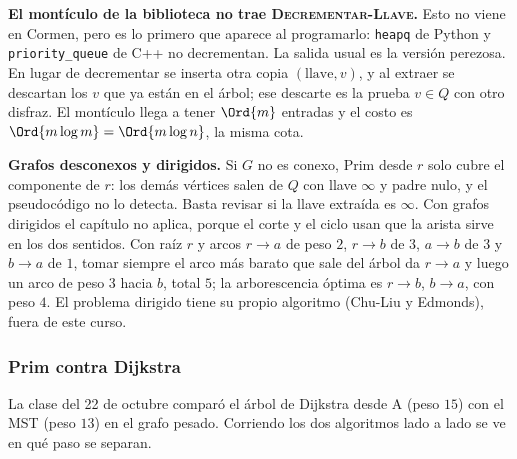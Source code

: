 \documentclass[11pt,letterpaper]{article}
\begin{document}
\begin{ojo}
  \textbf{El montículo de la biblioteca no trae
  \textsc{Decrementar-Llave}.} Esto no viene en Cormen, pero es lo
  primero que aparece al programarlo: \texttt{heapq} de Python y
  \texttt{priority\_queue} de C++ no decrementan. La salida usual es la
  versión perezosa. En lugar de decrementar se inserta otra copia
  $(\text{llave}, v)$, y al extraer se descartan los $v$ que ya están
  en el árbol; ese descarte es la prueba $v \in Q$ con otro disfraz. El
  montículo llega a tener $\Ord{m}$ entradas y el costo es
  $\Ord{m \log m} = \Ord{m \log n}$, la misma cota.
\end{ojo}

\begin{ojo}
  \textbf{Grafos desconexos y dirigidos.} Si $G$ no es conexo, Prim
  desde $r$ solo cubre el componente de $r$: los demás vértices salen
  de $Q$ con llave $\infty$ y padre nulo, y el pseudocódigo no lo
  detecta. Basta revisar si la llave extraída es $\infty$. Con grafos
  dirigidos el capítulo no aplica, porque el corte y el ciclo usan que
  la arista sirve en los dos sentidos. Con raíz $r$ y arcos $r \to a$
  de peso $2$, $r \to b$ de $3$, $a \to b$ de $3$ y $b \to a$ de $1$,
  tomar siempre el arco más barato que sale del árbol da $r \to a$ y
  luego un arco de peso $3$ hacia $b$, total $5$; la arborescencia
  óptima es $r \to b$, $b \to a$, con peso $4$. El problema dirigido
  tiene su propio algoritmo (Chu-Liu y Edmonds), fuera de este curso.
\end{ojo}

\subsubsection*{Prim contra Dijkstra}

La clase del 22 de octubre comparó el árbol de Dijkstra desde A
(peso $15$) con el MST (peso $13$) en el grafo pesado. Corriendo los
dos algoritmos lado a lado se ve en qué paso se separan.
\end{document}
